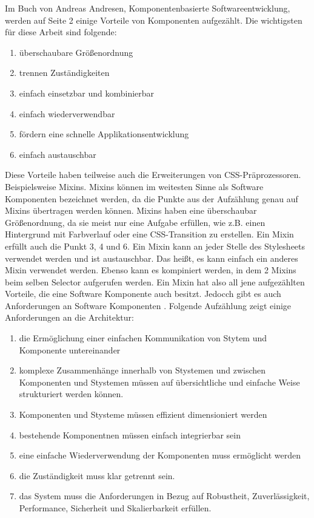 Im Buch von Andreas Andresen, Komponentenbasierte Softwareentwicklung, \autocite[2]{Andresen.2003} werden auf Seite 2 einige Vorteile von Komponenten aufgezählt. Die wichtigsten für diese Arbeit sind folgende:
\begin{enumerate}
  \item überschaubare Größenordnung
  \item trennen Zuständigkeiten
  \item einfach einsetzbar und kombinierbar
  \item einfach wiederverwendbar
  \item fördern eine schnelle Applikationsentwicklung
  \item einfach austauschbar
\end{enumerate} 
Diese Vorteile haben teilweise auch die Erweiterungen von CSS-Präprozessoren. Beispielsweise Mixins. Mixins können im weitesten Sinne als Software Komponenten bezeichnet werden, da die Punkte aus der Aufzählung genau auf Mixins übertragen werden können. Mixins haben eine überschaubar Größenordnung, da sie meist nur eine Aufgabe erfüllen, wie z.B. einen Hintergrund mit Farbverlauf oder eine CSS-Transition zu erstellen.\newline
Ein Mixin erfüllt auch die Punkt 3, 4 und 6. Ein Mixin kann an jeder Stelle des Stylesheets verwendet werden und ist austauschbar. Das heißt, es kann einfach ein anderes Mixin verwendet werden. Ebenso kann es kompiniert werden, in dem 2 Mixins beim selben Selector aufgerufen werden.\newline
Ein Mixin hat also all jene aufgezählten Vorteile, die eine Software Komponente auch besitzt. Jedocch gibt es auch Anforderungen an Software Komponenten \autocite[6]{Andresen.2003}. Folgende Aufzählung zeigt einige Anforderungen an die Architektur:
\begin{enumerate}
\item die Ermöglichung einer einfachen Kommunikation von Stytem und Komponente untereinander
\item komplexe Zusammenhänge innerhalb von Stystemen und zwischen Komponenten und Stystemen müssen auf übersichtliche und einfache Weise strukturiert werden können.
\item Komponenten und Stysteme müssen effizient dimensioniert werden
\item bestehende Komponentnen müssen einfach integrierbar sein
\item eine einfache Wiederverwendung der Komponenten muss ermöglicht werden
\item die Zuständigkeit muss klar getrennt sein.
\item das System muss die Anforderungen in Bezug auf Robustheit, Zuverlässigkeit, Performance, Sicherheit und Skalierbarkeit erfüllen.
\end{enumerate}

